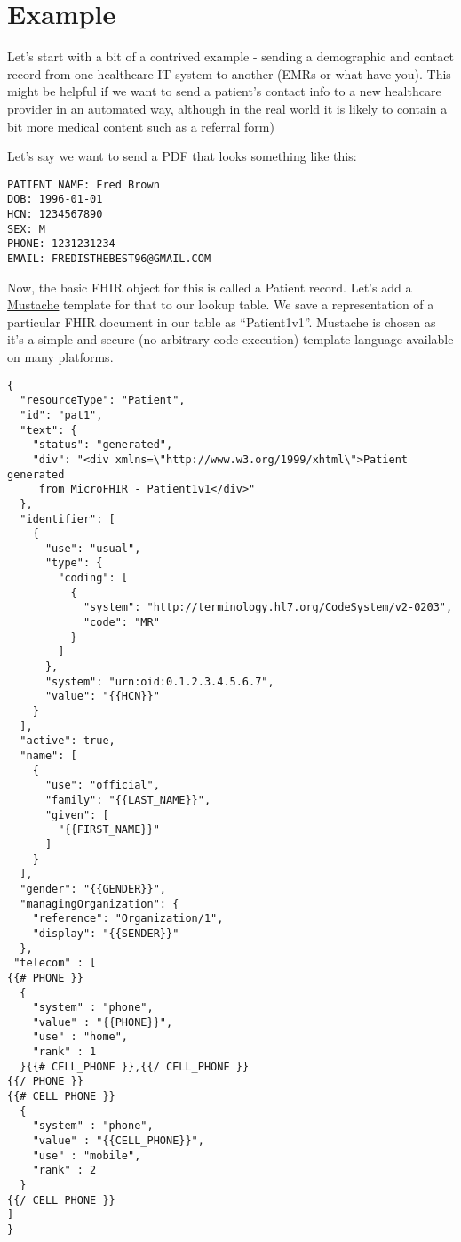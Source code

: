 \documentclass[12pt,a4paper]{article}
\begin{document}
\section{Example}
Let’s start with a bit of a contrived example - sending a demographic and contact record from one healthcare IT system to another (EMRs or what have you). This might be helpful if we want to send a patient’s contact info to a new healthcare provider in an automated way, although in the real world it is likely to contain a bit more medical content such as a referral form)

Let’s say we want to send a PDF that looks something like this:


\begin{minipage}{\hsize}%
\lstset{language=Python}%
\begin{lstlisting}[frame=single,framexleftmargin=-1pt,framexrightmargin=-17pt,framesep=12pt,linewidth=0.95\textwidth]
PATIENT NAME: Fred Brown
DOB: 1996-01-01
HCN: 1234567890
SEX: M
PHONE: 1231231234
EMAIL: FREDISTHEBEST96@GMAIL.COM
\end{lstlisting}
\end{minipage}

Now, the basic FHIR object for this is called a Patient record. Let’s add a \href{https://github.com/janl/mustache.js}{Mustache} template for that to our lookup table. We save a representation of a particular FHIR document in our table as “Patient1v1”. Mustache is chosen as it’s a simple and secure (no arbitrary code execution) template language available on many platforms.

\begin{verbatim}
{
  "resourceType": "Patient",
  "id": "pat1",
  "text": {
    "status": "generated",
    "div": "<div xmlns=\"http://www.w3.org/1999/xhtml\">Patient generated
     from MicroFHIR - Patient1v1</div>"
  },
  "identifier": [
    {
      "use": "usual",
      "type": {
        "coding": [
          {
            "system": "http://terminology.hl7.org/CodeSystem/v2-0203",
            "code": "MR"
          }
        ]
      },
      "system": "urn:oid:0.1.2.3.4.5.6.7",
      "value": "{{HCN}}"
    }
  ],
  "active": true,
  "name": [
    {
      "use": "official",
      "family": "{{LAST_NAME}}",
      "given": [
        "{{FIRST_NAME}}"
      ]
    }
  ],
  "gender": "{{GENDER}}",
  "managingOrganization": {
    "reference": "Organization/1",
    "display": "{{SENDER}}"
  },
 "telecom" : [
{{# PHONE }}
  {
    "system" : "phone",
    "value" : "{{PHONE}}",
    "use" : "home",
    "rank" : 1
  }{{# CELL_PHONE }},{{/ CELL_PHONE }}
{{/ PHONE }}
{{# CELL_PHONE }}
  {
    "system" : "phone",
    "value" : "{{CELL_PHONE}}",
    "use" : "mobile",
    "rank" : 2
  }
{{/ CELL_PHONE }}
]
}

\end{verbatim}
\end{document}
